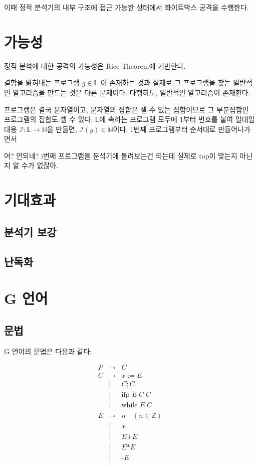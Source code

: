 \documentclass[ko]{snu-cse-bsc-thesis}
\begin{document}
이때 정적 분석기의 내부 구조에 접근 가능한 상태에서 화이트박스 공격을 수행한다.


\chapter{가능성}\label{chap:possibility}
정적 분석에 대한 공격의 가능성은 Rice Theorem에 기반한다.


결함을 밝혀내는 프로그램 $g \in \mathbb{L}$ 이 존재하는 것과 실제로 그 프로그램을 찾는 일반적인 알고리즘을 만드는 것은 다른 문제이다.
다행히도, 일반적인 알고리즘이 존재한다. 

프로그램은 결국 문자열이고, 문자열의 집합은 셀 수 있는 집합이므로 그 부분집합인 프로그램의 집합도 셀 수 있다.
$\mathbb{L}$에 속하는 프로그램 모두에 1부터 번호를 붙여 일대일 대응 $\mathcal{I} : \mathbb{L} \rightarrow \mathbb{N}$을 만들면, 
$\mathcal{I}(g) \in \mathbb{N}$이다. 1번째 프로그램부터 순서대로 만들어나가면서 


어? 안되네? i번째 프로그램을 분석기에 돌려보는건 되는데 실제로 top이 맞는지 아닌지 알 수가 없잖아.

\chapter{기대효과}\label{chap:expected_effects}
\section{분석기 보강}\label{sec:enhancement}
\section{난독화}\label{sec:obfuscation}

\chapter{G 언어}\label{chap:g_language}
\section{문법}\label{sec:syntax}
G 언어의 문법은 다음과 같다:

\[
\begin{array}{rcl}
P & \rightarrow & C \\[1em]
C & \rightarrow & x := E \\
  & \mid & C ; C \\
  & \mid & \text{ifp } E \; C \; C \\
  & \mid & \text{while } E \; C \\[1em]
E & \rightarrow & n \quad (n \in \mathbb{Z}) \\
  & \mid & x \\
  & \mid & E \text{+} E \\
  & \mid & E \text{*} E \\
  & \mid & \text{-}E
\end{array}
\]
\end{document}
